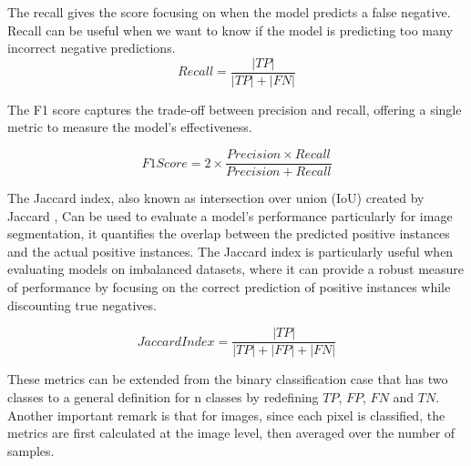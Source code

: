 The recall gives the score focusing on when the model predicts a false negative.
Recall can be useful when we want to know if the model is predicting too many incorrect negative predictions.
\begin{equation}
  Recall = \frac{|TP|}{|TP| + |FN|}
\end{equation}

The F1 score captures the trade-off between precision and recall, offering a single metric to measure the model's effectiveness.

\begin{equation}
  F1Score = 2 \times \frac{Precision \times Recall}{Precision + Recall}
\end{equation}

The Jaccard index, also known as intersection over union (IoU) created by Jaccard \cite{paul},
Can be used to evaluate a model's performance particularly for image segmentation,
it quantifies the overlap between the predicted positive instances and the actual positive instances.
The Jaccard index is particularly useful when evaluating models on imbalanced datasets, where it can provide a robust measure of performance by focusing on the correct prediction of positive instances while discounting true negatives.

\begin{equation}
  Jaccard Index = \frac{|TP|}{|TP| + |FP| + |FN|}
\end{equation}
\smallskip

These metrics can be extended from the binary classification case that has two classes to a general definition for n classes by redefining $TP$, $FP$, $FN$ and $TN$.
Another important remark is that for images, since each pixel is classified, the metrics are first calculated at the image level, then averaged over the number of samples.